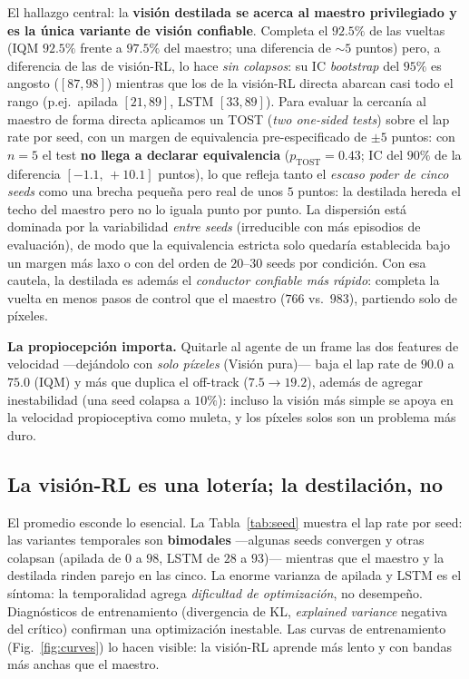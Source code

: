 \documentclass[conference]{IEEEtran}
\begin{document}
El hallazgo central: la \textbf{visi\'on destilada se acerca al maestro privilegiado y es la
\'unica variante de visi\'on confiable}. Completa el $92.5\%$ de las vueltas (IQM $92.5\%$ frente
a $97.5\%$ del maestro; una diferencia de $\sim5$ puntos) pero, a diferencia de las de visi\'on-RL,
lo hace \emph{sin colapsos}: su IC \emph{bootstrap} del $95\%$ es angosto ($[87,98]$) mientras que
los de la visi\'on-RL directa abarcan casi todo el rango (p.ej.\ apilada $[21,89]$, LSTM
$[33,89]$). Para evaluar la cercan\'ia al maestro de forma directa aplicamos un TOST
(\emph{two one-sided tests}) sobre el lap rate por seed, con un margen de equivalencia
pre-especificado de $\pm5$ puntos: con $n{=}5$ el test \textbf{no llega a declarar equivalencia}
($p_{\text{TOST}}=0.43$; IC del $90\%$ de la diferencia $[-1.1,\,+10.1]$ puntos), lo que refleja
tanto el \emph{escaso poder de cinco seeds} como una brecha peque\~na pero real de unos $5$ puntos:
la destilada hereda el techo del maestro pero no lo iguala punto por punto. La dispersi\'on est\'a
dominada por la variabilidad \emph{entre seeds} (irreducible con m\'as episodios de evaluaci\'on),
de modo que la equivalencia estricta solo quedar\'ia establecida bajo un margen m\'as laxo o con
del orden de $20$--$30$ seeds por condici\'on. Con esa cautela, la destilada es adem\'as el
\emph{conductor confiable m\'as r\'apido}: completa la vuelta en menos pasos de control que el
maestro ($766$ vs.\ $983$), partiendo solo de p\'ixeles.

\textbf{La propiocepci\'on importa.} Quitarle al agente de un frame las dos features de velocidad
---dej\'andolo con \emph{solo p\'ixeles} (Visi\'on pura)--- baja el lap rate de $90.0$ a $75.0$
(IQM) y m\'as que duplica el off-track ($7.5\!\to\!19.2$), adem\'as de agregar inestabilidad (una
seed colapsa a $10\%$): incluso la visi\'on m\'as simple se apoya en la velocidad propioceptiva
como muleta, y los p\'ixeles solos son un problema m\'as duro.

\subsection{La visi\'on-RL es una loter\'ia; la destilaci\'on, no}
El promedio esconde lo esencial. La Tabla~\ref{tab:seed} muestra el lap rate por seed: las
variantes temporales son \textbf{bimodales} ---algunas seeds convergen y otras colapsan
(apilada de $0$ a $98$, LSTM de $28$ a $93$)--- mientras que el maestro y la destilada rinden
parejo en las cinco. La enorme varianza de apilada y LSTM es el s\'intoma: la temporalidad agrega
\emph{dificultad de optimizaci\'on}, no desempe\~no. Diagn\'osticos de entrenamiento
(divergencia de KL, \emph{explained variance} negativa del cr\'itico) confirman una
optimizaci\'on inestable. Las curvas de entrenamiento (Fig.~\ref{fig:curves}) lo hacen visible:
la visi\'on-RL aprende m\'as lento y con bandas m\'as anchas que el maestro.
\end{document}

